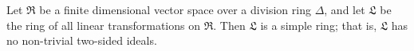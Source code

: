 Let $\mathfrak{R}$ be a finite dimensional vector space over a division ring $\Delta$, and let $\mathfrak{L}$ be the ring of all linear transformations on $\mathfrak{R}$. Then $\mathfrak{L}$ is a simple ring; that is, $\mathfrak{L}$ has no non-trivial two-sided ideals.
